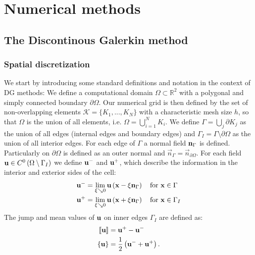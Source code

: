 \chapter{Numerical methods}	\label{ch:NumericalMethods}

\section{The Discontinous Galerkin method}
\subsection{Spatial discretization} \label{ssec:SpatDiscretization}
We start by introducing some standard definitions and notation in the context of DG methods:\cite{kummerExtendedDiscontinuousGalerkin2017} \cite{kikkerFullyCoupledHighorder}
We define a computational domain $\Omega \subset \mathbb{R}^2$ with a polygonal and simply connected boundary $\partial \Omega$. Our numerical grid is then defined by the set of non-overlapping elements $\mathcal{K} = \{K_1, ..., K_N\}$ with a characteristic mesh size $h$, so that $\Omega$ is the union of all elements, i.e. $\Omega = \bigcup_{i=1}^N K_i$. We define  $\Gamma = \bigcup_j \partial K_j$ as the union of all edges (internal edges and boundary edges) and $\Gamma_I = \Gamma \setminus \partial \Omega$ as the union of all interior edges.
For each edge of $\Gamma$ a normal field $\textbf{n}_{\Gamma}$ is defined. Particularly on $\partial \Omega$ is defined as an outer normal and $\vec{n}_\Gamma = \vec{n}_{\partial\Omega}$.
For each field $\textbf{u} \in C^0\left(\Omega\setminus \Gamma_I\right)$ we define  $\textbf{u}^-$  and  $\textbf{u}^+$, which describe the information in the interior and exterior sides of the cell:
\begin{align}
	\textbf{u}^- & = \lim_{\xi \searrow 0} \textbf{u}\left(\textbf{x} - \xi \textbf{n}_{\Gamma}\right) \quad \text{for } \textbf{x}\in \Gamma   \\
	\textbf{u}^+ & = \lim_{\xi \searrow 0} \textbf{u}\left(\textbf{x} + \xi \textbf{n}_{\Gamma}\right) \quad \text{for } \textbf{x}\in \Gamma_I
\end{align}
The jump and mean values of $\textbf{u}$ on inner edges $\Gamma_I$ are defined as:
\begin{align}
	\llbracket \textbf{u} \rrbracket & = \textbf{u}^+-\textbf{u}^-                           \\
	\{\textbf{u}\}                   & = \frac{1}{2} \left(\textbf{u}^-+\textbf{u}^+\right).
\end{align}
